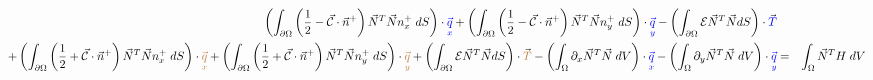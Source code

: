 \begin{landscape}
\begin{eqnarray}
\nonumber \\
 \left( \int_{\partial\Omega}  \left(\frac{1}{2} - \vec{\cal{C}} \cdot \vec{n}^+ \right) \vec{N}^T \vec{N} n^+_x  \; dS  \right) \cdot {\color{blue}\vec{\underset{\tiny x}{q}}}  
+ \left( \int_{\partial\Omega}  \left(\frac{1}{2} - \vec{\cal{C}} \cdot \vec{n}^+ \right) \vec{N}^T \vec{N} n^+_y  \; dS  \right) \cdot {\color{blue}\vec{\underset{\tiny y}{q}}}  
 - \left( \int_{\partial\Omega}   {\cal{E}}   \vec{N}^T \vec{N} dS \right) \cdot \vec{{\color{blue} T}}  && \nonumber\\
+  \left(\int_{\partial\Omega} \left(\frac{1}{2} + \vec{\cal{C}} \cdot \vec{n}^+ \right) \vec{N}^T \vec{N} {n}_x^+    \; dS \right) \cdot  {\color{brown}\vec{\underset{\tiny x}{q}}}
+ \left(\int_{\partial\Omega} \left(\frac{1}{2} + \vec{\cal{C}} \cdot \vec{n}^+ \right) \vec{N}^T \vec{N} {n}_y^+    \; dS \right) \cdot  {\color{brown}\vec{\underset{\tiny y}{q}}} 
+  \left( \int_{\partial\Omega}   {\cal{E}}   \vec{N}^T \vec{N} dS \right) \cdot \vec{{\color{brown} T}} 
- \left(\int_{\Omega} \partial_x \vec{N}^T \vec{N}   \; dV \right)\cdot {\color{blue}\vec{\underset{\tiny x}{q}}}  
- \left(\int_{\Omega} \partial_y \vec{N}^T \vec{N}   \; dV \right)\cdot {\color{blue}\vec{\underset{\tiny y}{q}}}  
&=&
\int_{\Omega} \vec{N}^T H  \;dV \nonumber 
\end{eqnarray}











\end{landscape}
